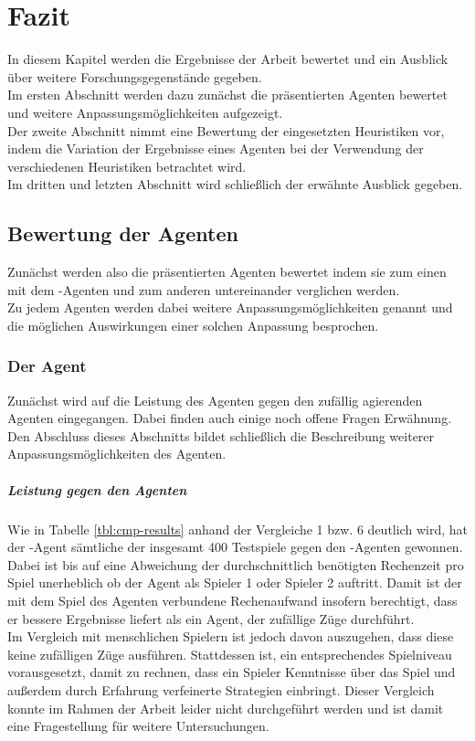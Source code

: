 \chapter{Fazit}
\label{Fazit}
In diesem Kapitel werden die Ergebnisse der Arbeit bewertet und ein Ausblick über weitere Forschungsgegenstände gegeben.
\\Im ersten Abschnitt werden dazu zunächst die präsentierten Agenten bewertet und weitere Anpassungsmöglichkeiten aufgezeigt.
\\Der zweite Abschnitt nimmt eine Bewertung der eingesetzten Heuristiken vor, indem die Variation der Ergebnisse eines Agenten bei der Verwendung der verschiedenen Heuristiken betrachtet wird.
\\Im dritten und letzten Abschnitt wird schließlich der erwähnte Ausblick gegeben.   

\section{Bewertung der Agenten}
Zunächst werden also die präsentierten Agenten bewertet indem sie zum einen mit dem -Agenten und zum anderen untereinander verglichen werden.
\\Zu jedem Agenten werden dabei weitere Anpassungsmöglichkeiten genannt und die möglichen Auswirkungen einer solchen Anpassung besprochen.
\subsection{Der Agent \mxZitat{\mc}}
Zunächst wird auf die Leistung des Agenten \mxZitat{\mc} gegen den zufällig agierenden Agenten eingegangen. Dabei finden auch einige noch offene Fragen Erwähnung. Den Abschluss dieses Abschnitts bildet schließlich die Beschreibung weiterer Anpassungsmöglichkeiten des Agenten.  
\paragraph{Leistung gegen den Agenten }
Wie in Tabelle \ref{tbl:cmp-results} anhand der Vergleiche 1 bzw. 6 deutlich wird, hat der \mxZitat{\mc}-Agent sämtliche der insgesamt 400 Testspiele gegen den -Agenten gewonnen. Dabei ist bis auf eine Abweichung der durchschnittlich benötigten Rechenzeit pro Spiel unerheblich ob der Agent als Spieler 1 oder Spieler 2 auftritt. Damit ist der mit dem Spiel des Agenten verbundene Rechenaufwand insofern berechtigt, dass er bessere Ergebnisse liefert als ein Agent, der zufällige Züge durchführt.
\\Im Vergleich mit menschlichen Spielern ist jedoch davon auszugehen, dass diese keine zufälligen Züge ausführen. Stattdessen ist, ein entsprechendes Spielniveau vorausgesetzt, damit zu rechnen, dass ein Spieler Kenntnisse über das Spiel und außerdem durch Erfahrung verfeinerte Strategien einbringt. Dieser Vergleich konnte im Rahmen der Arbeit leider nicht durchgeführt werden und ist damit eine Fragestellung für weitere Untersuchungen.  
